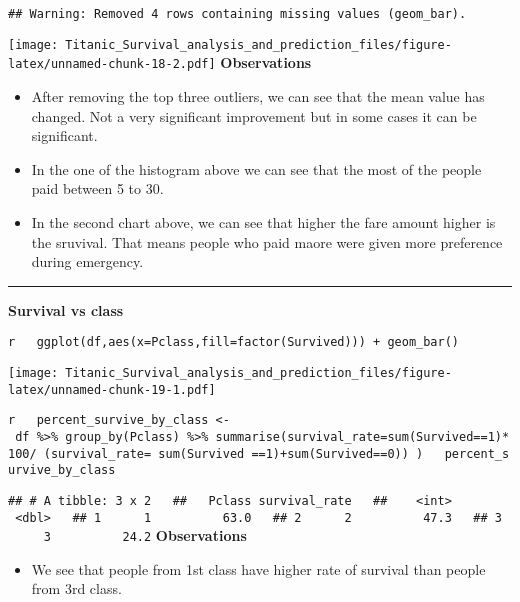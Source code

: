 \documentclass[]{article}
\providecommand{\tightlist}{%
  \setlength{\itemsep}{0pt}\setlength{\parskip}{0pt}}
\begin{document}
\begin{verbatim}
## Warning: Removed 4 rows containing missing values (geom_bar).
\end{verbatim}

\texttt{[image: Titanic\_Survival\_analysis\_and\_prediction\_files/figure-latex/unnamed-chunk-18-2.pdf]}
\textbf{Observations}

\begin{itemize}
\item
  After removing the top three outliers, we can see that the mean value
  has changed. Not a very significant improvement but in some cases it
  can be significant.
\item
  In the one of the histogram above we can see that the most of the
  people paid between 5 to 30.
\item
  In the second chart above, we can see that higher the fare amount
  higher is the sruvival. That means people who paid maore were given
  more preference during emergency.
\end{itemize}

\begin{center}\rule{0.5\linewidth}{\linethickness}\end{center}

\textbf{Survival vs class}

\texttt{r\ \ \ ggplot(df,aes(x=Pclass,fill=factor(Survived)))\ +\ geom\_bar()}

\texttt{[image: Titanic\_Survival\_analysis\_and\_prediction\_files/figure-latex/unnamed-chunk-19-1.pdf]}

\texttt{r\ \ \ percent\_survive\_by\_class\ \textless{}-\ df\ \%\textgreater{}\%\ group\_by(Pclass)\ \%\textgreater{}\%\ summarise(survival\_rate=sum(Survived==1)*100/\ (survival\_rate=\ sum(Survived\ ==1)+sum(Survived==0))\ )\ \ \ percent\_survive\_by\_class}

\texttt{\#\#\ \#\ A\ tibble:\ 3\ x\ 2\ \ \ \#\#\ \ \ Pclass\ survival\_rate\ \ \ \#\#\ \ \ \ \textless{}int\textgreater{}\ \ \ \ \ \ \ \ \ \textless{}dbl\textgreater{}\ \ \ \#\#\ 1\ \ \ \ \ \ 1\ \ \ \ \ \ \ \ \ \ 63.0\ \ \ \#\#\ 2\ \ \ \ \ \ 2\ \ \ \ \ \ \ \ \ \ 47.3\ \ \ \#\#\ 3\ \ \ \ \ \ 3\ \ \ \ \ \ \ \ \ \ 24.2}
\textbf{Observations}

\begin{itemize}
\tightlist
\item
  We see that people from 1st class have higher rate of survival than
  people from 3rd class.
\end{itemize}
\end{document}
